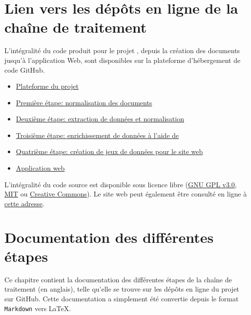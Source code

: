 
\appendix
\chapter{Lien vers les dépôts en ligne de la chaîne de traitement \ktb{}}
L'intégralité du code produit pour le projet \ktb{}, depuis la création des documents \tei{} jusqu'à l'application Web, sont disponibles sur la plateforme d'hébergement de code GitHub.
\begin{itemize}
	\item \href{https://github.com/katabase}{Plateforme du projet}
	\item \href{https://github.com/katabase/1_OutputData}{Première étape: normalisation des documents \tei{}}
	\item \href{https://github.com/katabase/2_CleanedData}{Deuxième étape: extraction de données et normalisation}
	\item \href{https://github.com/katabase/3_WikidataEnrichment}{Troisième étape: enrichissement de données à l'aide de \wkd{}}
	\item \href{https://github.com/katabase/4_TaggedData}{Quatrième étape: création de jeux de données \json{} pour le site web}
	\item \href{https://github.com/katabase/Application}{Application web \ktb{}}
\end{itemize}

L'intégralité du code source est disponible sous licence libre (\href{https://www.gnu.org/licenses/gpl-3.0.html}{GNU GPL v3.0}, \href{https://mit-license.org/}{MIT} ou \href{https://creativecommons.org/}{Creative Commons}). Le site web peut également être consulté en ligne à \href{https://katabase.huma-num.fr/}{cette adresse}.

\chapter{Documentation des différentes étapes}
Ce chapitre contient la documentation des différentes étapes de la chaîne de traitement (en anglais), telle qu'elle se trouve sur les dépôts en ligne du projet sur GitHub. Cette documentation a simplement été convertie depuis le format \texttt{Markdown} vers \LaTeX{}.
\clearpage

\clearpage

\clearpage

\clearpage

\clearpage


